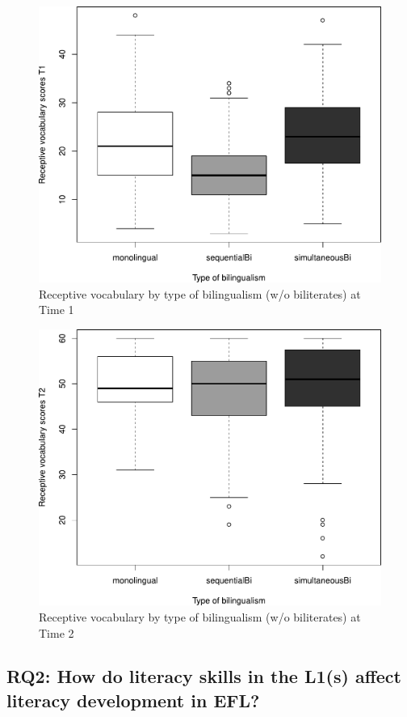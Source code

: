 \documentclass[output=paper,modfonts,nonflat,newtxmath]{langsci/langscibook}
\begin{document}
\begin{figure}[H] %
\includegraphics[width=.75\textwidth]{figures/PfenningerFigure5.pdf}
\caption{\label{fig:pfenninger:5}Receptive vocabulary by type of bilingualism (w/o biliterates) at Time 1}
\end{figure}
\pagebreak

\begin{figure}[H] %
\includegraphics[width=.75\textwidth]{figures/PfenningerFigure6.pdf}
\caption{\label{fig:pfenninger:6} Receptive vocabulary by type of bilingualism (w/o biliterates) at Time 2}
\end{figure}

\subsection{RQ2: {How} {do} {literacy} {skills} {in} {the} {L1(s)} {affect} {literacy} {development} {in} {EFL?}}

\end{document}
